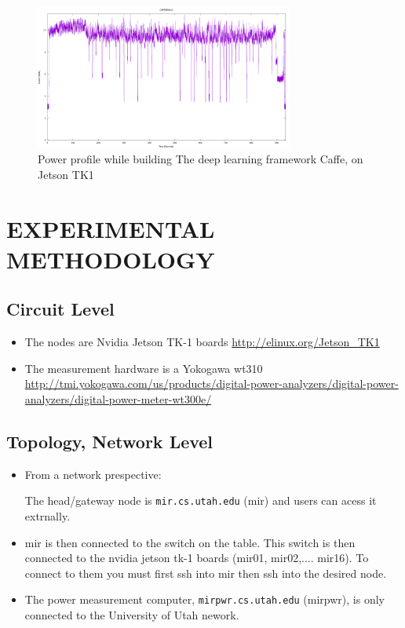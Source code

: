 \documentclass[letterpaper, 10 pt, conference]{ieeeconf}
\begin{document}
          \begin{figure}[h]
              \centering
              \includegraphics[width=85mm,scale=1]{caffe_make}
              \caption{Power profile while building The deep learning 
               framework Caffe, on Jetson TK1}
              \label{caffe_make}
          \end{figure}


\section{EXPERIMENTAL METHODOLOGY}

\subsection{Circuit Level}
\begin{itemize}
  \item The nodes are Nvidia Jetson TK-1 boards \url{http://elinux.org/Jetson_TK1}
  \item The measurement hardware is a Yokogawa  wt310 \url{http://tmi.yokogawa.com/us/products/digital-power-analyzers/digital-power-analyzers/digital-power-meter-wt300e/}
  \end{itemize}

\subsection{Topology, Network Level}

\begin{itemize}

  \item From a network prespective:

The head/gateway node is \verb|mir.cs.utah.edu| (mir) and users can acess it extrnally. 

\item mir is then connected to the switch on the table. This switch is then connected to the nvidia jetson tk-1 boards (mir01, mir02,.... mir16). To connect to them you must first ssh into mir then ssh into the desired node.

\item The power measurement computer, \verb|mirpwr.cs.utah.edu| (mirpwr), is only connected to the University of Utah nework.

\end{itemize}
\end{document}
